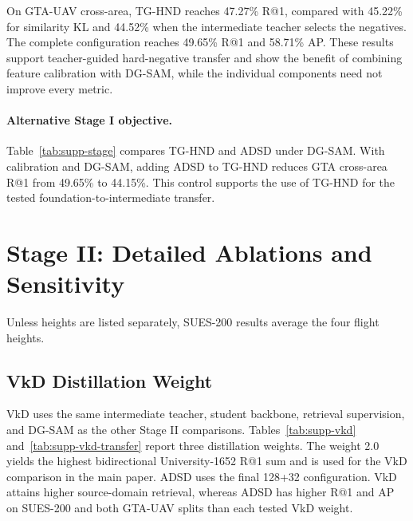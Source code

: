On GTA-UAV cross-area, TG-HND reaches 47.27\% R@1, compared with 45.22\% for similarity KL and 44.52\% when the intermediate teacher selects the negatives. The complete configuration reaches 49.65\% R@1 and 58.71\% AP. These results support teacher-guided hard-negative transfer and show the benefit of combining feature calibration with DG-SAM, while the individual components need not improve every metric.

\paragraph{Alternative Stage I objective.}
Table~\ref{tab:supp-stage} compares TG-HND and ADSD under DG-SAM. With calibration and DG-SAM, adding ADSD to TG-HND reduces GTA cross-area R@1 from 49.65\% to 44.15\%. This control supports the use of TG-HND for the tested foundation-to-intermediate transfer.

\par\medskip\noindent\begin{minipage}{\columnwidth}
\captionsetup{type=table}
\centering
\caption{Stage I objective controls with DG-SAM. ADSD uses 128+32 targets. SUES-200 averages four heights. Cells report D$\rightarrow$S R@1/AP (\%).}
\label{tab:supp-stage}
{\footnotesize\setlength{\tabcolsep}{2pt}\renewcommand{\arraystretch}{1.08}
}
\end{minipage}\par\medskip

\section{Stage II: Detailed Ablations and Sensitivity}
\label{sec:supp-dimensions}
Unless heights are listed separately, SUES-200 results average the four flight heights.
\subsection{VkD Distillation Weight}
VkD uses the same intermediate teacher, student backbone, retrieval supervision, and DG-SAM as the other Stage II comparisons. Tables~\ref{tab:supp-vkd} and~\ref{tab:supp-vkd-transfer} report three distillation weights. The weight 2.0 yields the highest bidirectional University-1652 R@1 sum and is used for the VkD comparison in the main paper. ADSD uses the final 128+32 configuration. VkD attains higher source-domain retrieval, whereas ADSD has higher R@1 and AP on SUES-200 and both GTA-UAV splits than each tested VkD weight.

